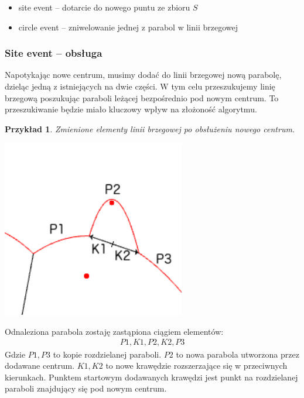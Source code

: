 \documentclass[declaration,shortabstract, inz]{iithesis}
\theoremstyle{definition} \newtheorem{definition}{Definicja}[]
\theoremstyle{plain} \newtheorem{remark}[definition]{Obserwacja}
\theoremstyle{plain} \newtheorem{theorem}[definition]{Twierdzenie}
\theoremstyle{plain} \newtheorem{example}{Przykład}[definition]
\theoremstyle{plain} \newtheorem{lemma}[definition]{Lemat}
\begin{document}
\begin{itemize}
	\item site event -- dotarcie do nowego puntu ze zbioru $S$
	\item circle event -- zniwelowanie jednej z parabol w linii brzegowej
\end{itemize}

\subsubsection{Site event -- obsługa}
\label{sec:site}
Napotykając nowe centrum, musimy dodać do linii brzegowej nową parabolę, dzieląc jedną z istniejących na dwie części. W tym celu przeszukujemy linię brzegową poszukując paraboli leżącej bezpośrednio pod nowym centrum. To przeszukiwanie będzie miało kluczowy wpływ na złożoność algorytmu. 

\begin{example}
	Zmienione elementy linii brzegowej po obsłużeniu nowego centrum.
	
	\begin{center}
		\includegraphics[width=0.6\textwidth]{ExampleSiteEvent}
	\end{center}
\end{example}

Odnaleziona parabola zostaję zastąpiona ciągiem elementów:
\begin{align}
 	P1, K1, P2, K2, P3
\end{align}
Gdzie $P1, P3$ to kopie rozdzielanej paraboli. $P2$ to nowa parabola utworzona przez dodawane centrum. $K1, K2$ to nowe krawędzie rozszerzające się w przeciwnych kierunkach. Punktem startowym dodawanych krawędzi jest punkt na rozdzielanej paraboli znajdujący się pod nowym centrum.
\end{document}
